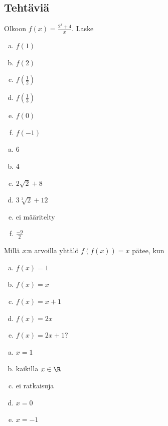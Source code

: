 \subsection*{Tehtäviä}
\begin{tehtava}
Olkoon $f(x)=\frac{2^x+4}{x}$. Laske
\begin{enumerate}[a)]
\item $f(1)$
\item $f(2)$
\item $f(\frac{1}{2})$
\item $f(\frac{1}{3})$
\item $f(0)$
\item $f(-1)$
\end{enumerate}
\begin{vastaus}
\begin{enumerate}[a)]
\item $6$
\item $4$
\item $2\sqrt{2}+8$
\item $3\sqrt[3]{2}+12$
\item ei määritelty
\item $\frac{-9}{2}$
\end{enumerate}
\end{vastaus}
\end{tehtava}

\begin{tehtava}
Millä $x$:n arvoilla yhtälö $f(f(x)) = x$ pätee, kun
\begin{enumerate}[a)]
\item $f(x) = 1$
\item $f(x) = x$
\item $f(x) = x+1$
\item $f(x) = 2x$
\item $f(x) = 2x+1$?
\end{enumerate}

\begin{vastaus}
\begin{enumerate}[a)]
\item $x = 1$
\item kaikilla $x\in\R$
\item ei ratkaisuja
\item $x = 0$
\item $x = -1$
\end{enumerate}
\end{vastaus}
\end{tehtava}
